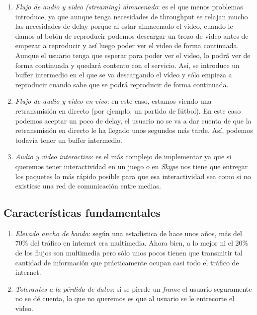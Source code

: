 \documentclass[10pt,a4paper,spanish]{report}
\begin{document}
\begin{enumerate}[\color{tema2}{$\heartsuit$}]
  \item \textcolor{tema2}{\textit{Flujo de audio y video (streaming) almacenado}}: es el que menos problemas introduce, ya que aunque tenga necesidades de throughput se relajan mucho las necesidades de delay porque al estar almacenado el video, cuando le damos al botón de reproducir podemos descargar un trozo de video antes de empezar a reproducir y así luego poder ver el video de forma continuada. Aunque el usuario tenga que esperar para poder ver el video, lo podrá ver de forma continuada y quedará contento con el servicio. Así, se introduce un buffer intermedio en el que se va descargando el vídeo y sólo empieza a reproducir cuando sabe que se podrá reproducir de forma continuada.
  \item \textcolor{tema2}{\textit{Flujo de audio y video en vivo}}: en este caso, estamos viendo una retransmisión en directo (por ejemplo, un partido de fútbol). En este caso podemos aceptar un poco de delay, el usuario no se va a dar cuenta de que la retransmisión en directo le ha llegado unos segundos más tarde. Así, podemos todavía tener un buffer intermedio.
  \item \textcolor{tema2}{\textit{Audio y video interactivo}}: es el más complejo de implementar ya que si queremos tener interactividad en un juego o en \textit{\textcolor{tema2}{Skype}} nos tiene que entregar los paquetes lo más rápido posible para que esa interactividad sea como si no existiese una red de comunicación entre medias. 
\end{enumerate}

\subsection{\textcolor{tema2}Características fundamentales}
\begin{enumerate}[\color{tema2}{$\bigstar$}]
  \item \textcolor{tema2}{\textit{Elevado ancho de banda}}: según una estadística de hace unos años, más del 70\% del tráfico en internet era multimedia. Ahora bien, a lo mejor ni el 20\% de los flujos son multimedia pero sólo unos pocos tienen que transmitir tal cantidad de información que prácticamente ocupan casi todo el tráfico de internet. 
  \item \textcolor{tema2}{\textit{Tolerantes a la pérdida de datos}}: si se pierde un \textcolor{tema2}{\textit{frame}} el usuario seguramente no se dé cuenta, lo que no queremos es que al usuario se le entrecorte el video.
\end{enumerate}
\end{document}
